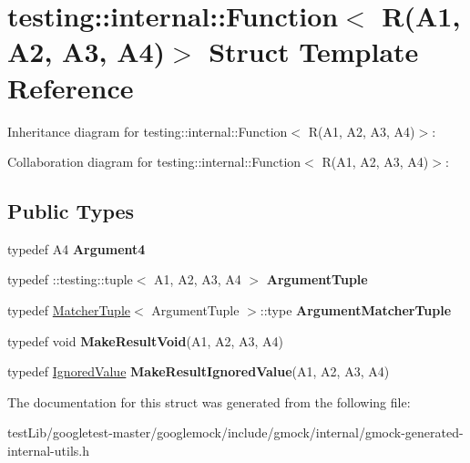 \hypertarget{structtesting_1_1internal_1_1Function_3_01R_07A1_00_01A2_00_01A3_00_01A4_08_4}{}\section{testing\+:\+:internal\+:\+:Function$<$ R(A1, A2, A3, A4)$>$ Struct Template Reference}
\label{structtesting_1_1internal_1_1Function_3_01R_07A1_00_01A2_00_01A3_00_01A4_08_4}


Inheritance diagram for testing\+:\+:internal\+:\+:Function$<$ R(A1, A2, A3, A4)$>$\+:


Collaboration diagram for testing\+:\+:internal\+:\+:Function$<$ R(A1, A2, A3, A4)$>$\+:
\subsection*{Public Types}
\begin{DoxyCompactItemize}
\item 
\mbox{\label{structtesting_1_1internal_1_1Function_3_01R_07A1_00_01A2_00_01A3_00_01A4_08_4_ae5039423598ab0fecd4f594acbf34d85}} 
typedef A4 {\bfseries Argument4}
\item 
\mbox{\label{structtesting_1_1internal_1_1Function_3_01R_07A1_00_01A2_00_01A3_00_01A4_08_4_a8ad9e0ae57a766f80a9816ad45626812}} 
typedef \+::testing\+::tuple$<$ A1, A2, A3, A4 $>$ {\bfseries Argument\+Tuple}
\item 
\mbox{\label{structtesting_1_1internal_1_1Function_3_01R_07A1_00_01A2_00_01A3_00_01A4_08_4_a9524b18868ab632a90d4cb6917057a14}} 
typedef \hyperlink{structtesting_1_1internal_1_1MatcherTuple}{Matcher\+Tuple}$<$ Argument\+Tuple $>$\+::type {\bfseries Argument\+Matcher\+Tuple}
\item 
\mbox{\label{structtesting_1_1internal_1_1Function_3_01R_07A1_00_01A2_00_01A3_00_01A4_08_4_af7462da27e87a9d580e7f9748ebc5754}} 
typedef void {\bfseries Make\+Result\+Void}(A1, A2, A3, A4)
\item 
\mbox{\label{structtesting_1_1internal_1_1Function_3_01R_07A1_00_01A2_00_01A3_00_01A4_08_4_a6736086d1c8ba25788add1e5180207f9}} 
typedef \hyperlink{classtesting_1_1internal_1_1IgnoredValue}{Ignored\+Value} {\bfseries Make\+Result\+Ignored\+Value}(A1, A2, A3, A4)
\end{DoxyCompactItemize}


The documentation for this struct was generated from the following file\+:\begin{DoxyCompactItemize}
\item 
test\+Lib/googletest-\/master/googlemock/include/gmock/internal/gmock-\/generated-\/internal-\/utils.\+h\end{DoxyCompactItemize}
